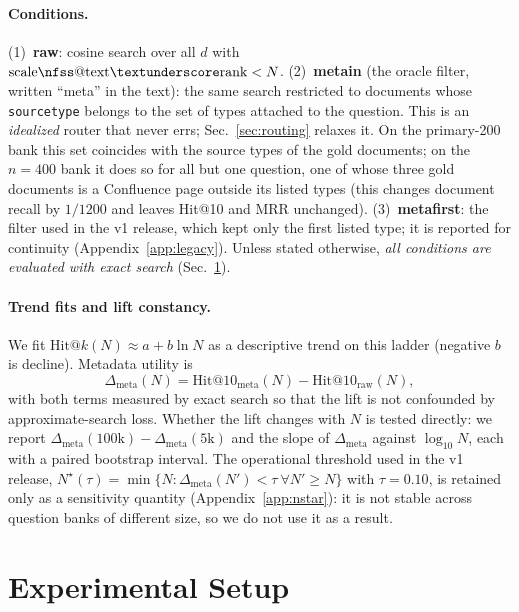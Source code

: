 \documentclass{ieeeaccess}
\makeatletter
\DeclareRobustCommand{\_}{\ifmmode\nfss@text{\textunderscore}\else\textunderscore\allowbreak\fi}
\makeatother
\begin{document}
\paragraph{Conditions.}
(1)~\textbf{raw}: cosine search over all $d$ with $\mathrm{scale\_rank}<N$. (2)~\textbf{meta\_in} (the oracle filter, written ``meta'' in the text): the same search restricted to documents whose \texttt{source\_type} belongs to the set of types attached to the question. This is an \emph{idealized} router that never errs; Sec.~\ref{sec:routing} relaxes it. On the primary-200 bank this set coincides with the source types of the gold documents; on the $n{=}400$ bank it does so for all but one question, one of whose three gold documents is a Confluence page outside its listed types (this changes document recall by $1/1200$ and leaves Hit@10 and MRR unchanged). (3)~\textbf{meta\_first}: the filter used in the v1 release, which kept only the first listed type; it is reported for continuity (Appendix~\ref{app:legacy}). Unless stated otherwise, \emph{all conditions are evaluated with exact search} (Sec.~\ref{sec:setup}).

\paragraph{Trend fits and lift constancy.}
We fit $\mathrm{Hit@}k(N)\approx a+b\ln N$ as a descriptive trend on this ladder (negative $b$ is decline). Metadata utility is
\begin{equation}
\Delta_{\mathrm{meta}}(N)=\mathrm{Hit@10}_{\mathrm{meta}}(N)-\mathrm{Hit@10}_{\mathrm{raw}}(N),
\end{equation}
with both terms measured by exact search so that the lift is not confounded by approximate-search loss. Whether the lift changes with $N$ is tested directly: we report $\Delta_{\mathrm{meta}}(100\text{k})-\Delta_{\mathrm{meta}}(5\text{k})$ and the slope of $\Delta_{\mathrm{meta}}$ against $\log_{10}N$, each with a paired bootstrap interval. The operational threshold used in the v1 release, $N^\star(\tau)=\min\{N:\Delta_{\mathrm{meta}}(N')<\tau\ \forall N'\ge N\}$ with $\tau{=}0.10$, is retained only as a sensitivity quantity (Appendix~\ref{app:nstar}): it is not stable across question banks of different size, so we do not use it as a result.

\section{Experimental Setup}
\label{sec:setup}
\end{document}
